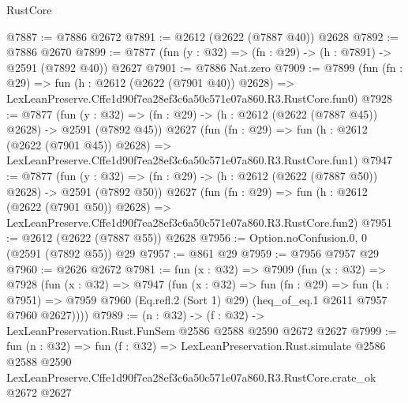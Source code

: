 \begin{lexlean}{RustCore}
\begin{coremodule}
@7887 := @7886 @2672
@7891 := @2612 (@2622 (@7887 @40)) @2628
@7892 := @7886 @2670
@7899 := @7877 (fun (y : @32) => (fn : @29) -> (h : @7891) -> @2591 (@7892 @40)) @2627
@7901 := @7886 Nat.zero
@7909 := @7899
    (fun (fn : @29) =>
    fun (h : @2612 (@2622 (@7901 @40)) @2628) =>
    LexLeanPreserve.Cffe1d90f7ea28ef3c6a50c571e07a860.R3.RustCore.fun0)
@7928 := @7877
    (fun (y : @32) => (fn : @29) -> (h : @2612 (@2622 (@7887 @45)) @2628) -> @2591 (@7892 @45))
    @2627
    (fun (fn : @29) =>
    fun (h : @2612 (@2622 (@7901 @45)) @2628) =>
    LexLeanPreserve.Cffe1d90f7ea28ef3c6a50c571e07a860.R3.RustCore.fun1)
@7947 := @7877
    (fun (y : @32) => (fn : @29) -> (h : @2612 (@2622 (@7887 @50)) @2628) -> @2591 (@7892 @50))
    @2627
    (fun (fn : @29) =>
    fun (h : @2612 (@2622 (@7901 @50)) @2628) =>
    LexLeanPreserve.Cffe1d90f7ea28ef3c6a50c571e07a860.R3.RustCore.fun2)
@7951 := @2612 (@2622 (@7887 @55)) @2628
@7956 := Option.noConfusion.{0, 0} (@2591 (@7892 @55)) @29
@7957 := @861 @29
@7959 := @7956 @7957 @29
@7960 := @2626 @2672
@7981 := fun (x : @32) =>
  @7909
    (fun (x : @32) =>
    @7928
      (fun (x : @32) =>
      @7947
        (fun (x : @32) =>
        fun (fn : @29) =>
        fun (h : @7951) =>
        @7959 @7960 (Eq.refl.{2} (Sort 1) @29) (heq_of_eq.{1} @2611 @7957 @7960 @2627))))
@7989 := (n : @32) -> (f : @32) -> LexLeanPreservation.Rust.FunSem @2586 @2588 @2590 @2672 @2627
@7999 := fun (n : @32) =>
  fun (f : @32) =>
  LexLeanPreservation.Rust.simulate
    @2586
    @2588
    @2590
    LexLeanPreserve.Cffe1d90f7ea28ef3c6a50c571e07a860.R3.RustCore.crate_ok
    @2672
    @2627
\end{coremodule}
\end{lexlean}
